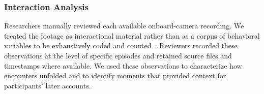 \subsubsection{Interaction Analysis}
\label{sec:video-analysis}

Researchers manually reviewed each available onboard-camera recording. We treated the footage as interactional material rather than as a corpus of behavioral variables to be exhaustively coded and counted~\cite{jordan1995interaction}. Reviewers recorded these observations at the level of specific episodes and retained source files and timestamps where available. We used these observations to characterize how encounters unfolded and to identify moments that provided context for participants' later accounts.